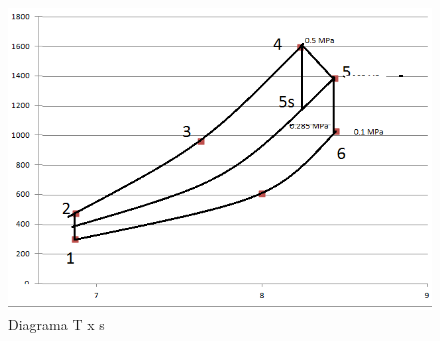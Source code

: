 \documentclass[a4paper, 12pt]{article}
\begin{document}
\begin{figure}[h]
\begin{center}
\includegraphics[scale=0.8,angle=-0.0]{./fig/2.png}
\caption{\label{fig:2}Diagrama T x s} 
\end{center}
\end{figure}
\end{document}
